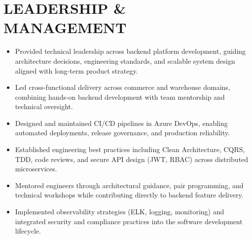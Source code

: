 ﻿\documentclass[letterpaper,10pt]{article}
\newcommand{\resumeItem}[1]{\item\small{#1}}
\newcommand{\resumeSubHeadingList}{\begin{itemize}[leftmargin=0.15in, label={}]}
\newcommand{\resumeSubHeadingListEnd}{\end{itemize}}
\begin{document}

\section{LEADERSHIP \& MANAGEMENT}
\resumeSubHeadingList
  \resumeItem{Provided technical leadership across backend platform development, guiding architecture decisions, engineering standards, and scalable system design aligned with long-term product strategy.}
  \resumeItem{Led cross-functional delivery across commerce and warehouse domains, combining hands-on backend development with team mentorship and technical oversight.}
  \resumeItem{Designed and maintained CI/CD pipelines in Azure DevOps, enabling automated deployments, release governance, and production reliability.}
  \resumeItem{Established engineering best practices including Clean Architecture, CQRS, TDD, code reviews, and secure API design (JWT, RBAC) across distributed microservices.}
  \resumeItem{Mentored engineers through architectural guidance, pair programming, and technical workshops while contributing directly to backend feature delivery.}
  \resumeItem{Implemented observability strategies (ELK, logging, monitoring) and integrated security and compliance practices into the software development lifecycle.}
\resumeSubHeadingListEnd

\end{document}
